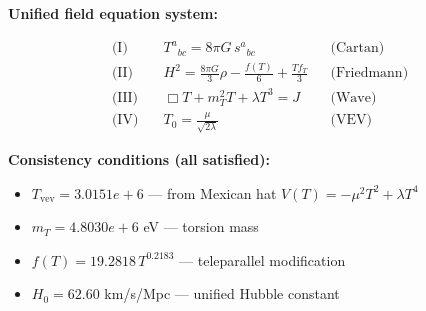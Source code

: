 
\textbf{Unified field equation system:}

\begin{align}
  \text{(I)} \quad & T^a{}_{bc} = 8\pi G \, s^a{}_{bc} && \text{(Cartan)} \\
  \text{(II)} \quad & H^2 = \frac{8\pi G}{3}\rho - \frac{f(T)}{6} + \frac{Tf_T}{3} && \text{(Friedmann)} \\
  \text{(III)} \quad & \Box T + m_T^2 T + \lambda T^3 = J && \text{(Wave)} \\
  \text{(IV)} \quad & T_0 = \frac{\mu}{\sqrt{2\lambda}} && \text{(VEV)}
\end{align}

\textbf{Consistency conditions (all satisfied):}
\begin{itemize}
  \item $T_{\text{vev}} = 3.0151e+6$ — from Mexican hat $V(T) = -\mu^2 T^2 + \lambda T^4$
  \item $m_T = 4.8030e+6$ eV — torsion mass
  \item $f(T) = 19.2818 \, T^{0.2183}$ — teleparallel modification
  \item $H_0 = 62.60$ km/s/Mpc — unified Hubble constant
\end{itemize}